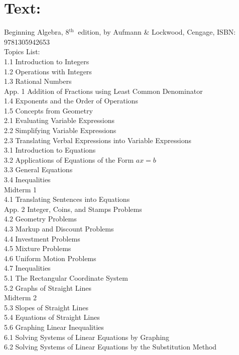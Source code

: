 \documentclass{ximera}
\begin{document}
\section*{Text:}
Beginning Algebra, $8{ }^{\text {th }}$ edition, by Aufmann \& Lockwood, Cengage, ISBN: 9781305942653\\
Topics List:\\
1.1 Introduction to Integers\\
1.2 Operations with Integers\\
1.3 Rational Numbers\\
App. 1 Addition of Fractions using Least Common Denominator\\
1.4 Exponents and the Order of Operations\\
1.5 Concepts from Geometry\\
2.1 Evaluating Variable Expressions\\
2.2 Simplifying Variable Expressions\\
2.3 Translating Verbal Expressions into Variable Expressions\\
3.1 Introduction to Equations\\
3.2 Applications of Equations of the Form $a x=b$\\
3.3 General Equations\\
3.4 Inequalities\\
Midterm 1\\
4.1 Translating Sentences into Equations\\
App. 2 Integer, Coins, and Stamps Problems\\
4.2 Geometry Problems\\
4.3 Markup and Discount Problems\\
4.4 Investment Problems\\
4.5 Mixture Problems\\
4.6 Uniform Motion Problems\\
4.7 Inequalities\\
5.1 The Rectangular Coordinate System\\
5.2 Graphs of Straight Lines\\
Midterm 2\\
5.3 Slopes of Straight Lines\\
5.4 Equations of Straight Lines\\
5.6 Graphing Linear Inequalities\\
6.1 Solving Systems of Linear Equations by Graphing\\
6.2 Solving Systems of Linear Equations by the Substitution Method\\
\end{document}
